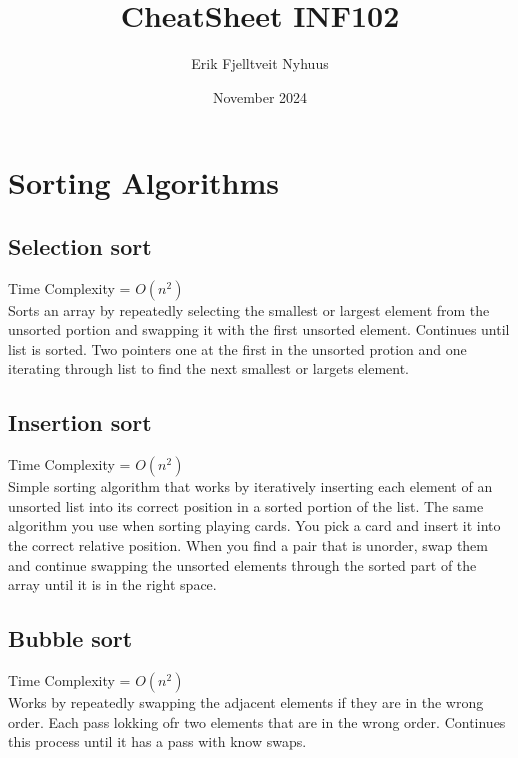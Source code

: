 \documentclass{article}
\title{CheatSheet INF102}
\author{Erik Fjelltveit Nyhuus}
\date{November 2024}
\begin{document}
\maketitle

\tableofcontents

\newpage


\section{Sorting Algorithms}
\subsection{Selection sort}
Time Complexity = $O(n^2)$\\
Sorts an array by repeatedly selecting the smallest or largest element from the unsorted portion
and swapping it with the first unsorted element. Continues until list is sorted.
Two pointers one at the first in the unsorted protion and one iterating through list to find the next smallest or largets element.
\subsection{Insertion sort}
Time Complexity = $O(n^2)$\\
Simple sorting algorithm that works by iteratively inserting each element of an unsorted list into its correct 
position in a sorted portion of the list. The same algorithm you use when sorting playing cards. 
You pick a card and insert it into the correct relative position. 
When you find a pair that is unorder, swap them and continue swapping the unsorted elements through the sorted part of the array until it is in the right space. 
\subsection{Bubble sort}
Time Complexity = $O(n^2)$\\
Works by repeatedly swapping the adjacent elements if they are in the wrong order. 
Each pass lokking ofr two elements that are in the wrong order. 
Continues this process until it has a pass with know swaps.
\end{document}
